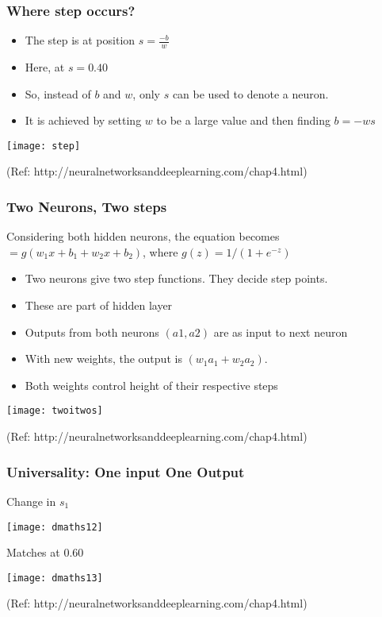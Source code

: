 \begin{frame}[fragile] \frametitle{Where step occurs?}
\begin{itemize}
\item The step is at position $s=\frac{-b}{w}$
\item Here, at $s = 0.40$
\item So, instead of $b$ and $w$, only $s$ can be used to denote a neuron.
\item It is achieved by setting $w$ to be a large value and then finding $b = -ws$
\end{itemize}
\begin{center}
\texttt{[image: step]}
\end{center}
{\tiny (Ref: http://neuralnetworksanddeeplearning.com/chap4.html)}
\end{frame}



\begin{frame}[fragile] \frametitle{Two Neurons, Two steps}
Considering both hidden neurons, the equation becomes $= g(w_1x+b_1 + w_2x+b_2)$, where $g(z) = 1/(1+ e^{-z})$
\begin{itemize}
\item Two neurons give two step functions. They decide step points.
\item These are part of hidden layer
\item Outputs from both neurons $(a1,a2)$ are as input to next neuron
\item With new weights, the output is $(w_1 a_1+w_2 a_2).$
\item Both weights control height of their respective steps


\end{itemize}
\begin{center}
\texttt{[image: twoitwos]}
\end{center}
{\tiny (Ref: http://neuralnetworksanddeeplearning.com/chap4.html)}
\end{frame}

\begin{frame}[fragile] \frametitle{Universality: One input One Output}
Change in $s_1$

\begin{center}
\texttt{[image: dmaths12]}
\end{center}
Matches at 0.60
\begin{center}
\texttt{[image: dmaths13]}
\end{center}

{\tiny (Ref: http://neuralnetworksanddeeplearning.com/chap4.html)}
\end{frame}

